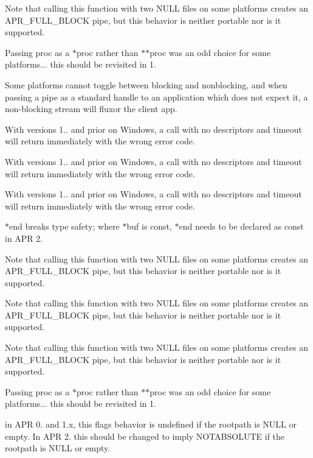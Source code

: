 \begin{DoxyRefList}
Note that calling this function with two N\+U\+LL files on some platforms creates an A\+P\+R\+\_\+\+F\+U\+L\+L\+\_\+\+B\+L\+O\+CK pipe, but this behavior is neither portable nor is it supported.

Passing proc as a $\ast$proc rather than $\ast$$\ast$proc was an odd choice for some platforms... this should be revisited in 1.  
\item[\label{bug__bug000002}%
\Hypertarget{bug__bug000002}%
Member \mbox{\hyperlink{group__apr__time_ga57bfe39a9516843a151a65cd02f84616}{A\+P\+R\+\_\+\+D\+E\+C\+L\+A\+RE}} (apr\+\_\+status\+\_\+t) apr\+\_\+time\+\_\+ansi\+\_\+put(apr\+\_\+time\+\_\+t $\ast$result]Some platforms cannot toggle between blocking and nonblocking, and when passing a pipe as a standard handle to an application which does not expect it, a non-\/blocking stream will fluxor the client app. 

With versions 1.. and prior on Windows, a call with no descriptors and timeout will return immediately with the wrong error code. 

With versions 1.. and prior on Windows, a call with no descriptors and timeout will return immediately with the wrong error code. 

With versions 1.. and prior on Windows, a call with no descriptors and timeout will return immediately with the wrong error code. 

$\ast$end breaks type safety; where $\ast$buf is const, $\ast$end needs to be declared as const in A\+PR 2. 

Note that calling this function with two N\+U\+LL files on some platforms creates an A\+P\+R\+\_\+\+F\+U\+L\+L\+\_\+\+B\+L\+O\+CK pipe, but this behavior is neither portable nor is it supported.

Note that calling this function with two N\+U\+LL files on some platforms creates an A\+P\+R\+\_\+\+F\+U\+L\+L\+\_\+\+B\+L\+O\+CK pipe, but this behavior is neither portable nor is it supported.

Note that calling this function with two N\+U\+LL files on some platforms creates an A\+P\+R\+\_\+\+F\+U\+L\+L\+\_\+\+B\+L\+O\+CK pipe, but this behavior is neither portable nor is it supported.

Passing proc as a $\ast$proc rather than $\ast$$\ast$proc was an odd choice for some platforms... this should be revisited in 1.  
\item[\label{bug__bug000001}%
\Hypertarget{bug__bug000001}%
Member \mbox{\hyperlink{group__apr__filepath_gabb57ce7b23caf512d7f64b92a662ab3d}{A\+P\+R\+\_\+\+F\+I\+L\+E\+P\+A\+T\+H\+\_\+\+N\+O\+T\+A\+B\+O\+V\+E\+R\+O\+OT}} ]in A\+PR 0. and 1.\+x, this flag\textquotesingle{}s behavior is undefined if the rootpath is N\+U\+LL or empty. In A\+PR 2. this should be changed to imply N\+O\+T\+A\+B\+S\+O\+L\+U\+TE if the rootpath is N\+U\+LL or empty. 
\end{DoxyRefList}